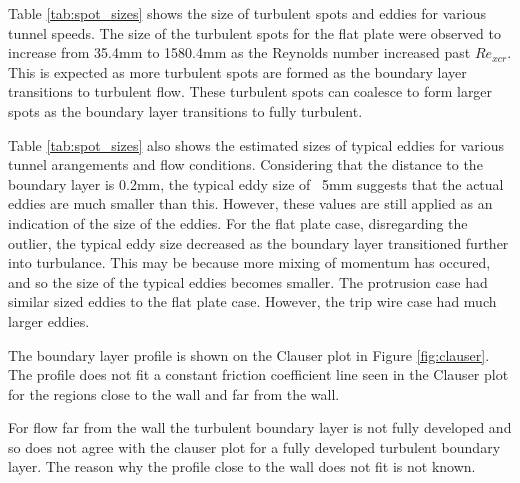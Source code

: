 \documentclass{article}
\begin{document}

Table \ref{tab:spot_sizes} shows the size of turbulent spots and eddies for various tunnel speeds.
The size of the turbulent spots for the flat plate were observed to increase from 35.4mm to 1580.4mm as the Reynolds number increased past $Re_{xcr}$.
This is expected as more turbulent spots are formed as the boundary layer transitions to turbulent flow.
These turbulent spots can coalesce to form larger spots as the boundary layer transitions to fully turbulent.


Table \ref{tab:spot_sizes} also shows the estimated sizes of typical eddies for various tunnel arangements and flow conditions.
Considering that the distance to the boundary layer is 0.2mm, the typical eddy size of ~5mm suggests that the actual eddies are much smaller than this.
However, these values are still applied as an indication of the size of the eddies.
For the flat plate case, disregarding the outlier, the typical eddy size decreased as the boundary layer transitioned further into turbulance.
This may be because more mixing of momentum has occured, and so the size of the typical eddies becomes smaller.
The protrusion case had similar sized eddies to the flat plate case.
However, the trip wire case had much larger eddies.


The boundary layer profile is shown on the Clauser plot in Figure \ref{fig:clauser}.
The profile does not fit a constant friction coefficient line seen in the Clauser plot for the regions close to the wall and far from the wall.

For flow far from the wall the turbulent boundary layer is not fully developed and so does not agree with the clauser plot for a fully developed turbulent boundary layer.
The reason why the profile close to the wall does not fit is not known.
\end{document}
